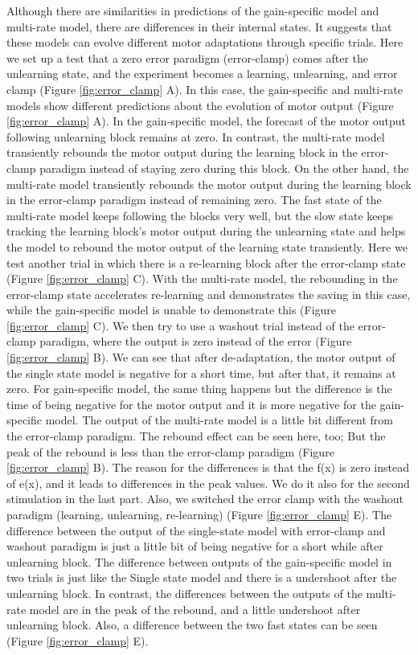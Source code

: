 \documentclass[9pt,twocolumn]{paper-template}
\begin{document}
Although there are similarities in predictions of the gain-specific model and multi-rate model, there are differences in their internal states. It suggests that these models can evolve different motor adaptations through specific trials. Here we set up a test that a zero error paradigm (error-clamp) comes after the unlearning state, and the experiment becomes a learning, unlearning, and error clamp (Figure \ref{fig:error_clamp} A). In this case, the gain-specific and multi-rate models show different predictions about the evolution of motor output (Figure \ref{fig:error_clamp} A). In the gain-specific model, the forecast of the motor output following unlearning block remains at zero.
In contrast, the multi-rate model transiently rebounds the motor output during the learning block in the error-clamp paradigm instead of staying zero during this block. On the other hand, the multi-rate model transiently rebounds the motor output during the learning block in the error-clamp paradigm instead of remaining zero. The fast state of the multi-rate model keeps following the blocks very well, but the slow state keeps tracking the learning block's motor output during the unlearning state and helps the model to rebound the motor output of the learning state transiently. Here we test another trial in which there is a re-learning block after the error-clamp state (Figure \ref{fig:error_clamp} C). With the multi-rate model, the rebounding in the error-clamp state accelerates re-learning and demonstrates the saving in this case, while the gain-specific model is unable to demonstrate this (Figure \ref{fig:error_clamp} C).
We then try to use a washout trial instead of the error-clamp paradigm, where the output is zero instead of the error (Figure \ref{fig:error_clamp} B). We can see that after de-adaptation, the motor output of the single state model is negative for a short time, but after that, it remains at zero. For gain-specific model, the same thing happens but the difference is the time of being negative for the motor output and it is more negative for the gain-specific model. The output of the multi-rate model is a little bit different from the error-clamp paradigm. The rebound effect can be seen here, too; But the peak of the rebound is less than the error-clamp paradigm (Figure \ref{fig:error_clamp} B). The reason for the differences is that the f(x) is zero instead of e(x), and it leads to differences in the peak values. We do it also for the second stimulation in the last part. Also, we switched the error clamp with the washout paradigm (learning, unlearning, re-learning) (Figure \ref{fig:error_clamp} E). The difference between the output of the single-state model with error-clamp and washout paradigm is just a little bit of being negative for a short while after unlearning block. The difference between outputs of the gain-specific model in two trials is just like the Single state model and there is a undershoot after the unlearning block. In contrast, the differences between the outputs of the multi-rate model are in the peak of the rebound, and a little undershoot after unlearning block. Also, a difference between the two fast states can be seen (Figure \ref{fig:error_clamp} E).
\end{document}

